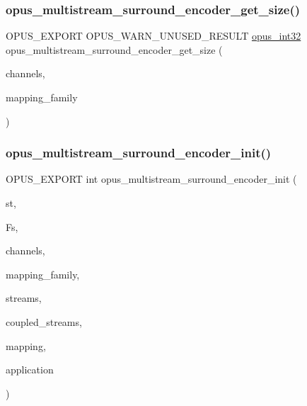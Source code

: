 \subsubsection{\texorpdfstring{opus\+\_\+multistream\+\_\+surround\+\_\+encoder\+\_\+get\+\_\+size()}{opus\_multistream\_surround\_encoder\_get\_size()}}
{\footnotesize\ttfamily O\+P\+U\+S\+\_\+\+E\+X\+P\+O\+RT O\+P\+U\+S\+\_\+\+W\+A\+R\+N\+\_\+\+U\+N\+U\+S\+E\+D\+\_\+\+R\+E\+S\+U\+LT \hyperlink{opus__types_8h_aa4d309d6f80b99dbabebc8f98879ab9a}{opus\+\_\+int32} opus\+\_\+multistream\+\_\+surround\+\_\+encoder\+\_\+get\+\_\+size (\begin{DoxyParamCaption}\item[{int}]{channels,  }\item[{int}]{mapping\+\_\+family }\end{DoxyParamCaption})}

\mbox{\label{group__opus__multistream_ga786d90cfe8f8b8f371b0137ac76b1559}} 
\subsubsection{\texorpdfstring{opus\+\_\+multistream\+\_\+surround\+\_\+encoder\+\_\+init()}{opus\_multistream\_surround\_encoder\_init()}}
{\footnotesize\ttfamily O\+P\+U\+S\+\_\+\+E\+X\+P\+O\+RT int opus\+\_\+multistream\+\_\+surround\+\_\+encoder\+\_\+init (\begin{DoxyParamCaption}\item[{\hyperlink{group__opus__multistream_gae5826674d142fc873ebc1d781c507dd7}{Opus\+M\+S\+Encoder} $\ast$}]{st,  }\item[{\hyperlink{opus__types_8h_aa4d309d6f80b99dbabebc8f98879ab9a}{opus\+\_\+int32}}]{Fs,  }\item[{int}]{channels,  }\item[{int}]{mapping\+\_\+family,  }\item[{int $\ast$}]{streams,  }\item[{int $\ast$}]{coupled\+\_\+streams,  }\item[{unsigned char $\ast$}]{mapping,  }\item[{int}]{application }\end{DoxyParamCaption})}

